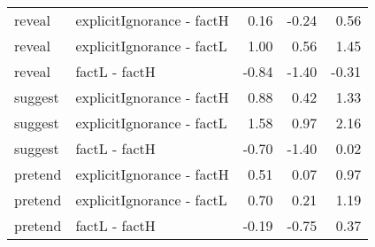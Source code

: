 \begin{longtable}{llrrr}
  reveal & explicitIgnorance - factH & 0.16 & -0.24 & 0.56 \\ 
  reveal & explicitIgnorance - factL & 1.00 & 0.56 & 1.45 \\ 
  reveal & factL - factH & -0.84 & -1.40 & -0.31 \\ 
  suggest & explicitIgnorance - factH & 0.88 & 0.42 & 1.33 \\ 
  suggest & explicitIgnorance - factL & 1.58 & 0.97 & 2.16 \\ 
  suggest & factL - factH & -0.70 & -1.40 & 0.02 \\ 
  pretend & explicitIgnorance - factH & 0.51 & 0.07 & 0.97 \\ 
  pretend & explicitIgnorance - factL & 0.70 & 0.21 & 1.19 \\ 
  pretend & factL - factH & -0.19 & -0.75 & 0.37 \\ 
  \end{longtable}

